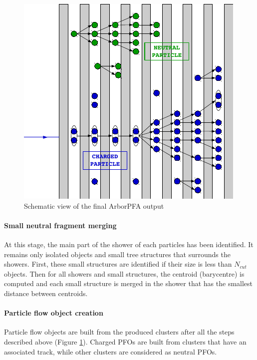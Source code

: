\documentclass[cits]{JINST}
\begin{document}
\begin{figure}
  \vspace{-20pt}
  \begin{center}
    \includegraphics[width=\linewidth]{PfoCreation.pdf}
  \end{center}
  \vspace{-10pt}
  \caption{\label{ARBOR_PFO_CREATION} Schematic view of the final ArborPFA output}
  \vspace{-20pt}
\end{figure}

\paragraph*{Small neutral fragment merging} At this stage, the main part of the shower of each particles has been identified. It remains only isolated objects and small tree structures that surrounds the showers. First, these small structures are identified if their size is less than $N_{cut}$ objects. Then for all showers and small structures, the centroid (barycentre) is computed and each small structure is merged in the shower that has the smallest distance between centroids.

\paragraph*{Particle flow object creation} Particle flow objects are built from the produced clusters after all the steps described above (Figure \ref{ARBOR_PFO_CREATION}). Charged PFOs are built from clusters that have an associated track, while other clusters are considered as neutral PFOs.
\end{document}
